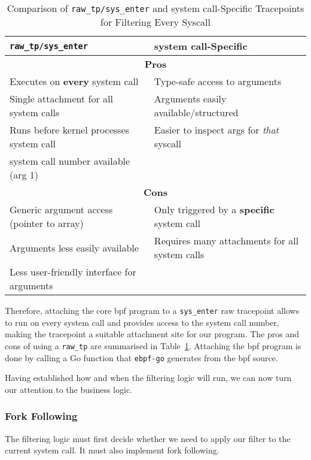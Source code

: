 \begin{table}[h!]
\centering
\caption{Comparison of \texttt{raw\_tp/sys\_enter} and system call-Specific Tracepoints for Filtering Every Syscall}
\begin{tabular}{|p{6cm}|p{6cm}|}
\hline
\texttt{raw\_tp/sys\_enter} & \textbf{system call-Specific} \\
\hline
\multicolumn{2}{|c|}{\textbf{Pros}} \\
\hline
Executes on \textbf{every} system call & Type-safe access to arguments \\
Single attachment for all system calls & Arguments easily available/structured \\
Runs before kernel processes system call & Easier to inspect args for \textit{that} syscall \\
system call number available (arg 1) &  \\
\hline
\multicolumn{2}{|c|}{\textbf{Cons}} \\
\hline
Generic argument access (pointer to array) & Only triggered by a \textbf{specific} system call \\
Arguments less easily available & Requires many attachments for all system calls \\
Less user-friendly interface for arguments &  \\
\hline
\end{tabular}
\label{tab:tracepoint_comparison}
\end{table}

Therefore, attaching the core \ac{bpf} program to a \texttt{sys\_enter} raw
tracepoint allows \af to run on every system call and provides access to the
system call number, making the tracepoint a suitable attachment site for our
program. The pros and cons of using a \texttt{raw\_tp} are summarised in
Table~\ref{tab:tracepoint_comparison}. Attaching the \ac{bpf} program is done by calling a Go function that
\texttt{ebpf-go} generates from the \ac{bpf} source. 

Having established how and when the \af filtering logic will run, we can now
turn our attention to the business logic.

\subsubsection{Fork Following}

The filtering logic must first decide whether we
need to apply our filter to the current system call. It must also implement fork following. 

